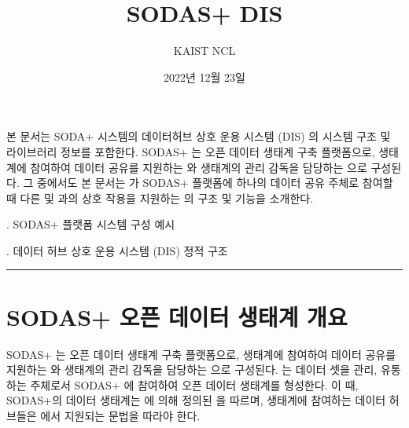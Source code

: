 \documentclass[a4paper,10pt,english]{sphinxmanual}
\title{SODAS+ DIS}
\date{2022년 12월 23일}
\author{KAIST NCL}
\begin{document}
\pagestyle{empty}
\sphinxmaketitle
\pagestyle{plain}
\sphinxtableofcontents
\pagestyle{normal}
\label{\detokenize{index::doc}}


\sphinxAtStartPar
본 문서는 SODA+ 시스템의 데이터허브 상호 운용 시스템 (DIS) 의 시스템 구조 및 라이브러리 정보를 포함한다.
SODAS+ 는 오픈 데이터 생태계 구축 플랫폼으로, 생태계에 참여하여 데이터 공유를 지원하는  와
생태계의 관리 감독을 담당하는  으로 구성된다.
그 중에서도 본 문서는  가 SODAS+ 플랫폼에 하나의 데이터 공유 주체로 참여할 때
다른  및  과의 상호 작용을 지원하는
 의 구조 및 기능을 소개한다.


\sphinxAtStartPar
{}. SODAS+ 플랫폼 시스템 구성 예시

\begin{DUlineblock}{0em}
\item[] 
\end{DUlineblock}


\sphinxAtStartPar
{}. 데이터 허브 상호 운용 시스템 (DIS) 정적 구조


\bigskip\hrule\bigskip


\sphinxstepscope


\chapter{SODAS+ 오픈 데이터 생태계 개요}
\label{\detokenize{intro_sodas:sodas}}\label{\detokenize{intro_sodas::doc}}
\sphinxAtStartPar
SODAS+ 는 오픈 데이터 생태계 구축 플랫폼으로, 생태계에 참여하여 데이터 공유를 지원하는 {\hyperref[\detokenize{intro_sodas:datahub}]{}}  와
생태계의 관리 감독을 담당하는 {\hyperref[\detokenize{intro_sodas:governance-system}]{}}  으로 구성된다.  는 데이터 셋을 관리, 유통하는 주체로서
SODAS+ 에 참여하여 오픈 데이터 생태계를 형성한다.
이 때, SODAS+의 데이터 생태계는  에 의해 정의된  을 따르며, 생태계에 참여하는 데이터 허브들은  에서 지원되는 문법을 따라야 한다.
\end{document}
